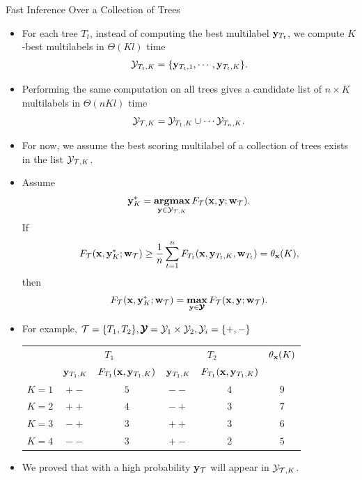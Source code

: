 \documentclass[first=dgreen,second=purple,logo=yellowexc]{aaltoslides}
\begin{document}
%
\begin{frame}[allowframebreaks]{Fast Inference Over a Collection of Trees}
	\begin{itemize}
		\item For each tree $T_t$, instead of computing the best multilabel $\mathbf {y}_{T_t}$, we compute $K$-best multilabels in $\Theta(Kl)$ time
		\begin{align*}
			\mathcal{Y}_{T_t,K} = \{\mathbf {y}_{T_t,1},\cdots,\mathbf {y}_{T_t,K}\}.
		\end{align*}
		\item Performing the same computation on all trees gives a candidate list of $n\times K$ multilabels in $\Theta(nKl)$ time
		\begin{align*}
			\mathcal{Y}_{\mathcal{T},K}=\mathcal{Y}_{T_1,K}\cup\cdots\mathcal{Y}_{T_n,K}.
		\end{align*}
		\item For now, we assume the best scoring multilabel of a collection of trees exists in the list $\mathcal{Y}_{\mathcal{T},K}$. 
		\item Assume 
		\begin{align*}
		\mathbf {y}_K^*=\underset{\mathbf {y}\in\mathcal{Y}_{\mathcal{T},K}}{\textbf{argmax}}\,F_{\mathcal{T}}(\mathbf {x},\mathbf {y};\mathbf {w}_{\mathcal{T}}).
		\end{align*} 
		If
		\begin{align*}
			F_{\mathcal{T}}(\mathbf {x},\mathbf {y}_K^*;\mathbf {w}_{\mathcal{T}})\ge\frac{1}{n}\sum_{t=1}^{n}F_{T_t}(\mathbf {x},\mathbf {y}_{T_t,K},\mathbf {w}_{T_t})=\theta_{\mathbf {x}}(K),
		\end{align*}
		then 
		\begin{align*}
			F_{\mathcal{T}}(\mathbf {x},\mathbf {y}_K^*;\mathbf {w}_{\mathcal{T}}) = \underset{\mathbf {y}\in\pmb {\mathcal{Y}}}{\textbf{max}}\,F_{\mathcal{T}}(\mathbf {x},\mathbf {y};\mathbf {w}_{\mathcal{T}}).
		\end{align*}
		\framebreak
		\item For example, $\mathcal{T}=\{T_1,T_2\},\pmb {\mathcal{Y}}=\mathcal{Y}_1\times\mathcal{Y}_2,\mathcal{Y}_i=\{+,-\}$
		\begin{table}
			\begin{tabular}{|c|cc|cc|c|} \hline
				\multirow{2}{*}{} & \multicolumn{2}{c|}{$T_1$} & \multicolumn{2}{c|}{$T_2$} & $\theta_{\mathbf {x}}(K)$\\ \cline{2-5}
				& $\mathbf {y}_{T_1,K}$ & $F_{T_1}(\mathbf {x},\mathbf {y}_{T_1,K})$ & $\mathbf {y}_{T_1,K}$ & $F_{T_1}(\mathbf {x},\mathbf {y}_{T_1,K})$ & \\ \hline
				$K=1$ & $+-$ & $5$ & $--$ & $4$ & $9$\\ \hline
				$K=2$ & $++$ & $4$ & $-+$ & $3$ & $7$\\ \hline
				$K=3$ & $-+$ & $3$ & $++$ & $3$ & $6$\\ \hline
				$K=4$ & $--$ & $3$ & $+-$ & $2$ & $5$\\ \hline
			\end{tabular}
		\end{table}
		\item We proved that with a high probability $\mathbf {y}_{\mathcal{T}}$ will appear in $\mathcal{Y}_{\mathcal{T},K}$.
	\end{itemize}
\end{frame}
\end{document}
